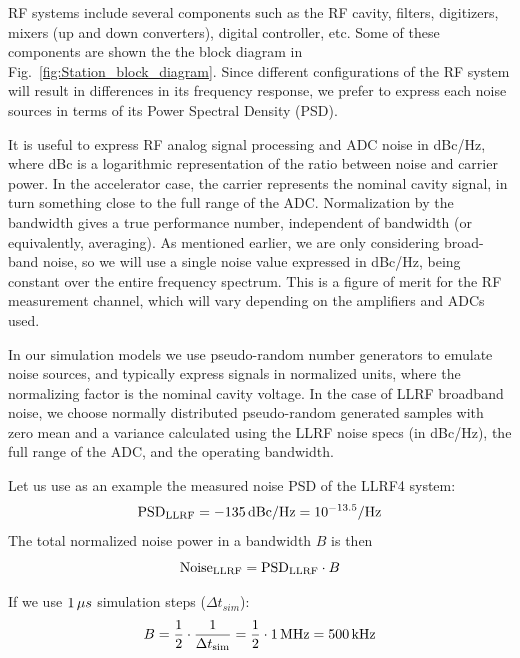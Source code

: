 \documentclass[a4paper,12pt]{article}
\begin{document}
RF systems include several components such as the RF cavity, filters, digitizers, mixers (up and down converters), digital controller, etc. Some of these components are shown the the block diagram in Fig.~\ref{fig:Station_block_diagram}. Since different configurations of the RF system will result in differences in its frequency response, we prefer to express each noise sources in terms of its Power Spectral Density (PSD).

It is useful to express RF analog signal processing and ADC noise in dBc/Hz, where dBc is a logarithmic representation of the ratio between noise and carrier power. In the accelerator case, the carrier represents the nominal cavity signal, in turn something close to the full range of the \hbox{ADC}.  Normalization by the bandwidth gives a true performance number, independent of bandwidth (or equivalently, averaging). As mentioned earlier, we are only considering broad-band noise, so we will use a single noise value expressed in dBc/Hz, being constant over the entire frequency spectrum. This is a figure of merit for the RF measurement channel, which will vary depending on the amplifiers and ADCs used.

In our simulation models we use pseudo-random number generators to emulate noise sources, and typically express signals in normalized units, where the normalizing factor is the nominal cavity voltage. In the case of LLRF broadband noise, we choose normally distributed pseudo-random generated samples with zero mean and a variance calculated using the LLRF noise specs (in dBc/Hz), the full range of the ADC, and the operating bandwidth.

Let us use as an example the measured noise PSD of the LLRF4 system:
\begin{equation}
  \centering {\rm PSD}_{\rm LLRF} = -135\thinspace{\rm dBc/Hz} = 10^{-13.5} {\rm /Hz}
\end{equation}
The total normalized noise power in a bandwidth $B$ is then
\begin{equation}
  \centering {\rm Noise}_{\rm LLRF} ={\rm PSD}_{\rm LLRF}\cdot B
  \label{eq:PSD_to_noise}
\end{equation}

\noindent If we use $1\thinspace\mu s$ simulation steps ($\Delta t_{sim}$):
\begin{equation}
  \centering B = \frac{1}{2} \cdot \frac{1}{\Delta t_{\rm sim}}=\frac{1}{2} \cdot 1\thinspace {\rm MHz} = 500\thinspace {\rm kHz}
\end{equation}
\end{document}
